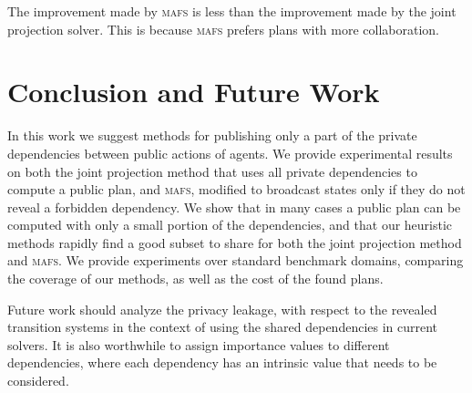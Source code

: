 \documentclass{article}
\newcommand{\mafs}{\textsc {mafs}\xspace}
\newcommand{\commentout}[1]{}
\newcommand{\roni}[1]{\textbf{\color{blue}[RONI:#1]}}
\theoremstyle{remark}
\begin{document}
The improvement made by \mafs is less than the improvement made by the joint projection solver. 
This is because \mafs prefers plans with more collaboration.


\section{Conclusion and Future Work}

In this work we suggest methods for publishing only a part of the private dependencies between public actions of agents. We provide experimental results on both the joint projection method that uses all private dependencies to compute a public plan, and \mafs, modified to broadcast states only if they do not reveal a forbidden dependency. We show that in many cases a public plan can be computed with only a small portion of the dependencies, and that our heuristic methods rapidly find a good subset to share for both the joint projection method and \mafs.
We provide experiments over standard benchmark domains, comparing the coverage of our methods, as well as the cost of the found plans. 

Future work should analyze the privacy leakage, with respect to the revealed transition systems \cite{StolbaFK19} in the context of using the shared dependencies in current solvers.
It is also worthwhile to assign importance values to different dependencies, where each dependency has an intrinsic value that needs to be considered. %
\commentout{\roni{Rotem, I editted the above part, please review}}

\commentout{
\section*{Acknowledgements}
This work is partially funded by ISF grant \# 210/17 to Roni Stern and by ISF grant \# 1210/18 to Guy Shani.
}

\newpage
% 


\end{document}
